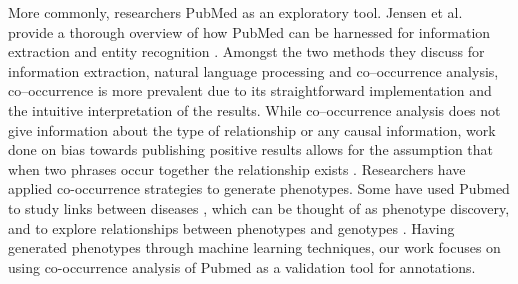 \documentclass{sig-alternate}
\begin{document}
More commonly, researchers PubMed as an exploratory tool.
Jensen et al. provide a thorough overview of how PubMed can be harnessed for information extraction and entity recognition \cite{jensen2006literature}.
Amongst the two methods they discuss for information extraction, natural language processing and co--occurrence analysis, co--occurrence is more prevalent due to its straightforward implementation and the intuitive interpretation of the results.
While co--occurrence analysis does not give information about the type of relationship or any causal information, work done on bias towards publishing positive results allows for the assumption that when two phrases occur together the relationship exists \cite{dickersin1990existence,easterbrook1991publication,stern1997publication}.
Researchers have applied co-occurrence strategies to generate phenotypes. 
Some have used Pubmed to study links between diseases \cite{rajpal2014mining}, which can be thought of as phenotype discovery, and to explore relationships between phenotypes and genotypes \cite{pletscher2015diseases}.
Having generated phenotypes through machine learning techniques, our work focuses on using co-occurrence analysis of Pubmed as a validation tool for annotations.

\end{document}
